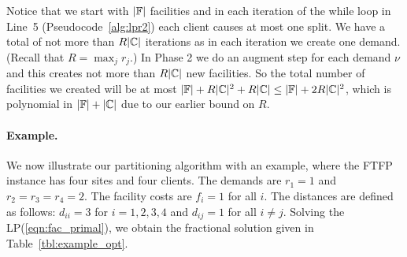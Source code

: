 \documentclass[oneside,final]{ucr}
\begin{document}
Notice that we start with $|\mathbb{F}|$ facilities and in
each iteration of the while loop in Line~5
(Pseudocode~\ref{alg:lpr2}) each client causes at most one
split.  We have a total of not more than $R|\mathbb{C}|$
iterations as in each iteration we create one
demand. (Recall that $R = \max_jr_j$.) In Phase 2 we do an
augment step for each demand $\nu$ and this creates not more
than $R|\mathbb{C}|$ new facilities.  So the total number of
facilities we created will be at most $|\mathbb{F}|+
R|\mathbb{C}|^2 + R|\mathbb{C}| \leq |\mathbb{F}| +
2R|\mathbb{C}|^2$, which is polynomial in
$|\mathbb{F}|+|\mathbb{C}|$ due to our earlier bound on $R$.

\paragraph{Example.}
We now illustrate our partitioning algorithm with an example, where the FTFP instance
has four sites and four clients. The demands are $r_1=1$ and $r_2=r_3=r_4=2$.
The facility costs are $f_i = 1$ for all $i$. The distances are defined as follows: 
$d_{ii} = 3$ for $i=1,2,3,4$ and $d_{ij} = 1$ for all $i\neq j$. 
Solving the LP(\ref{eqn:fac_primal}), we obtain the fractional solution given in
Table~\ref{tbl:example_opt}.
%
\end{document}
